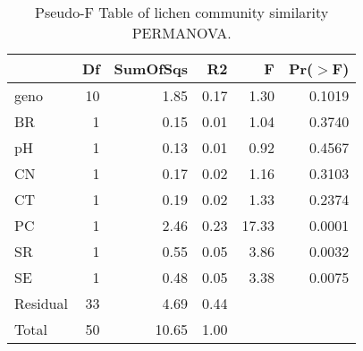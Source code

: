 \begin{table}[ht]
\centering
\begin{tabular}{lrrrrr}
  \hline
 & Df & SumOfSqs & R2 & F & Pr($>$F) \\ 
  \hline
geno & 10 & 1.85 & 0.17 & 1.30 & 0.1019 \\ 
  BR & 1 & 0.15 & 0.01 & 1.04 & 0.3740 \\ 
  pH & 1 & 0.13 & 0.01 & 0.92 & 0.4567 \\ 
  CN & 1 & 0.17 & 0.02 & 1.16 & 0.3103 \\ 
  CT & 1 & 0.19 & 0.02 & 1.33 & 0.2374 \\ 
  PC & 1 & 2.46 & 0.23 & 17.33 & 0.0001 \\ 
  SR & 1 & 0.55 & 0.05 & 3.86 & 0.0032 \\ 
  SE & 1 & 0.48 & 0.05 & 3.38 & 0.0075 \\ 
  Residual & 33 & 4.69 & 0.44 &  &  \\ 
  Total & 50 & 10.65 & 1.00 &  &  \\ 
   \hline
\end{tabular}
\caption{Pseudo-F Table of lichen community similarity PERMANOVA.} 
\label{tab:com_perm}
\end{table}

